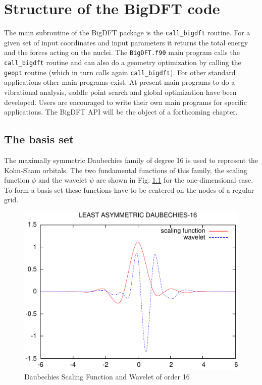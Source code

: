 \documentclass[a4paper,11pt]{report}
\begin{document}
\chapter{Structure of the BigDFT code}
\noindent
The main subroutine of the BigDFT package is the \texttt{call\_bigdft} routine. For a given set of input coordinates 
and input parameters it returns the total energy and the forces acting on the nuclei. The \texttt{BigDFT.f90} main program 
calls the \texttt{call\_bigdft} routine and can also do a geometry optimization by calling the \texttt{geopt} routine (which in turn calls 
again \texttt{call\_bigdft}). For other standard applications other main programs exist.
At present main programs to do a vibrational analysis, saddle point search and global optimization have been developed.
Users are encouraged to write their own main programs for specific applications. 
The BigDFT API will be the object of a forthcoming chapter.
\section{The basis set}
The maximally symmetric Daubechies family of degree 16 is used to represent 
the Kohn-Sham orbitals. The two fundamental functions of this family, 
the scaling function $\phi$ and the wavelet $\psi$ are shown in Fig. \ref{sym_16} 
for the one-dimensional case.
To form a basis set these functions have to be centered on the nodes of a regular grid.
\begin{figure}[ht]
\begin{center}
\includegraphics[width=\textwidth]{sym_16.pdf}
\end{center}
\label{sym_16}
\caption{Daubechies Scaling Function and Wavelet of order 16}
\end{figure}
\end{document}
